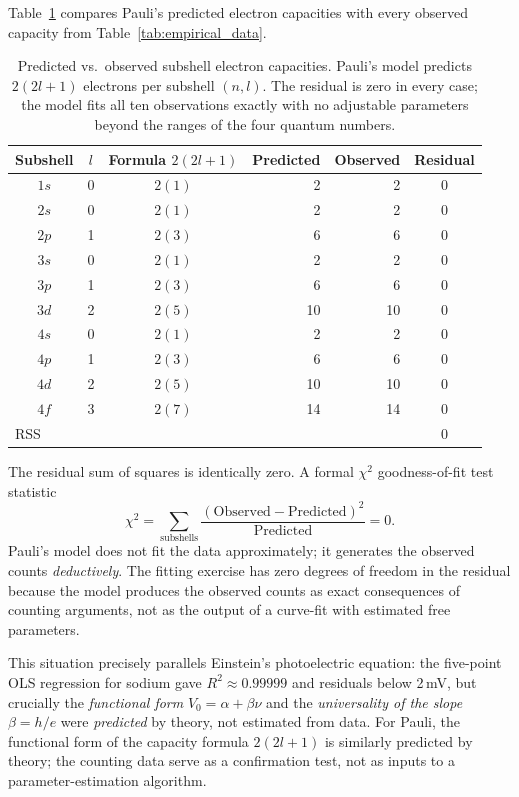 \documentclass[12pt]{article}
\begin{document}
Table~\ref{tab:fit} compares Pauli's predicted electron capacities with
every observed capacity from Table~\ref{tab:empirical_data}.

\begin{table}[ht]
\centering
\caption{Predicted vs.\ observed subshell electron capacities.  Pauli's
model predicts $2(2l+1)$ electrons per subshell $(n,l)$.  The residual
is zero in every case; the model fits all ten observations exactly with
no adjustable parameters beyond the ranges of the four quantum numbers.}
\label{tab:fit}
\medskip
\begin{tabular}{cccrrc}
\toprule
Subshell & $l$ & Formula $2(2l+1)$ &
Predicted & Observed & Residual \\
\midrule
$1s$ & 0 &  $2(1)$  &  2 &  2 & $0$ \\
$2s$ & 0 &  $2(1)$  &  2 &  2 & $0$ \\
$2p$ & 1 &  $2(3)$  &  6 &  6 & $0$ \\
$3s$ & 0 &  $2(1)$  &  2 &  2 & $0$ \\
$3p$ & 1 &  $2(3)$  &  6 &  6 & $0$ \\
$3d$ & 2 &  $2(5)$  & 10 & 10 & $0$ \\
$4s$ & 0 &  $2(1)$  &  2 &  2 & $0$ \\
$4p$ & 1 &  $2(3)$  &  6 &  6 & $0$ \\
$4d$ & 2 &  $2(5)$  & 10 & 10 & $0$ \\
$4f$ & 3 &  $2(7)$  & 14 & 14 & $0$ \\
\midrule
\multicolumn{4}{l}{RSS} & & $0$ \\
\bottomrule
\end{tabular}
\end{table}

\noindent The residual sum of squares is identically zero.  A formal
$\chi^2$ goodness-of-fit test statistic
\[
  \chi^2 = \sum_{\text{subshells}}
  \frac{(\text{Observed} - \text{Predicted})^2}{\text{Predicted}}
  = 0.
\]
Pauli's model does not fit the data approximately; it generates the
observed counts \emph{deductively}.  The fitting exercise has zero
degrees of freedom in the residual because the model produces
the observed counts as exact consequences of counting arguments,
not as the output of a curve-fit with estimated free parameters.

\medskip
This situation precisely parallels Einstein's photoelectric equation: the
five-point OLS regression for sodium gave $R^2 \approx 0.99999$ and
residuals below 2\,mV, but crucially the \emph{functional form}
$V_0 = \alpha + \beta\nu$ and the \emph{universality of the slope} $\beta = h/e$
were \emph{predicted} by theory, not estimated from data.  For Pauli, the
functional form of the capacity formula $2(2l+1)$ is similarly predicted by
theory; the counting data serve as a confirmation test, not as inputs to a
parameter-estimation algorithm.
\end{document}
